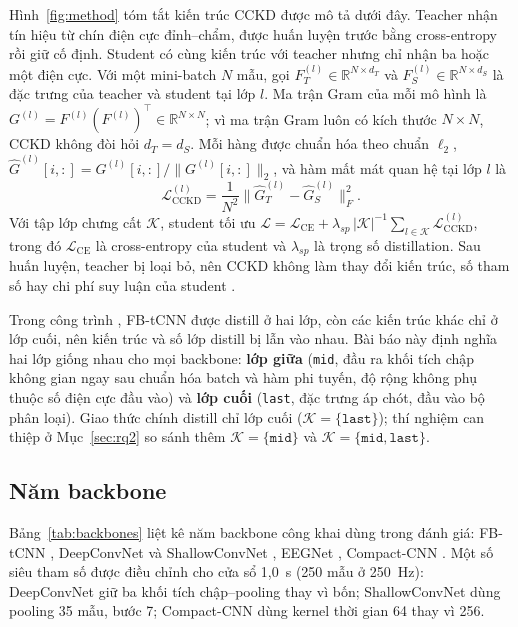 \documentclass[11pt,a4paper,twoside,asymmetric]{article}
\begin{document}
Hình~\ref{fig:method} tóm tắt kiến trúc CCKD được mô tả dưới đây. Teacher nhận tín hiệu từ chín điện cực đỉnh--chẩm, được huấn luyện trước bằng cross-entropy rồi giữ cố định. Student có cùng kiến trúc với teacher nhưng chỉ nhận ba hoặc một điện cực. Với một mini-batch $N$ mẫu, gọi $F_T^{(l)} \in \mathbb{R}^{N \times d_T}$ và $F_S^{(l)} \in \mathbb{R}^{N \times d_S}$ là đặc trưng của teacher và student tại lớp $l$. Ma trận Gram của mỗi mô hình là $G^{(l)} = F^{(l)} (F^{(l)})^{\top} \in \mathbb{R}^{N \times N}$; vì ma trận Gram luôn có kích thước $N \times N$, CCKD không đòi hỏi $d_T = d_S$. Mỗi hàng được chuẩn hóa theo chuẩn $\ell_2$, $\hat{G}^{(l)}[i,:] = G^{(l)}[i,:] / \lVert G^{(l)}[i,:] \rVert_2$, và hàm mất mát quan hệ tại lớp $l$ là
\begin{equation}
\mathcal{L}_{\text{CCKD}}^{(l)} = \frac{1}{N^2} \bigl\lVert \hat{G}_{T}^{(l)} - \hat{G}_{S}^{(l)} \bigr\rVert_F^2 .
\label{eq:relloss}
\end{equation}
Với tập lớp chưng cất $\mathcal{K}$, student tối ưu $\mathcal{L} = \mathcal{L}_{\text{CE}} + \lambda_{sp} \, |\mathcal{K}|^{-1} \sum_{l \in \mathcal{K}} \mathcal{L}_{\text{CCKD}}^{(l)}$, trong đó $\mathcal{L}_{\text{CE}}$ là cross-entropy của student và $\lambda_{sp}$ là trọng số distillation. Sau huấn luyện, teacher bị loại bỏ, nên CCKD không làm thay đổi kiến trúc, số tham số hay chi phí suy luận của student \cite{R82}.

Trong công trình \cite{R82}, FB-tCNN được distill ở hai lớp, còn các kiến trúc khác chỉ ở lớp cuối, nên kiến trúc và số lớp distill bị lẫn vào nhau. Bài báo này định nghĩa hai lớp giống nhau cho mọi backbone: \textbf{lớp giữa} (\texttt{mid}, đầu ra khối tích chập không gian ngay sau chuẩn hóa batch và hàm phi tuyến, độ rộng không phụ thuộc số điện cực đầu vào) và \textbf{lớp cuối} (\texttt{last}, đặc trưng áp chót, đầu vào bộ phân loại). Giao thức chính distill chỉ lớp cuối ($\mathcal{K}=\{\texttt{last}\}$); thí nghiệm can thiệp ở Mục~\ref{sec:rq2} so sánh thêm $\mathcal{K}=\{\texttt{mid}\}$ và $\mathcal{K}=\{\texttt{mid},\texttt{last}\}$.

\subsection{Năm backbone}
\label{sec:backbones}

Bảng~\ref{tab:backbones} liệt kê năm backbone công khai dùng trong đánh giá: FB-tCNN \cite{R16}, DeepConvNet và ShallowConvNet \cite{R83}, EEGNet \cite{R84}, Compact-CNN \cite{R85}. Một số siêu tham số được điều chỉnh cho cửa sổ 1,0~s (250 mẫu ở 250~Hz): DeepConvNet giữ ba khối tích chập--pooling thay vì bốn; ShallowConvNet dùng pooling 35 mẫu, bước 7; Compact-CNN dùng kernel thời gian 64 thay vì 256.
\end{document}
